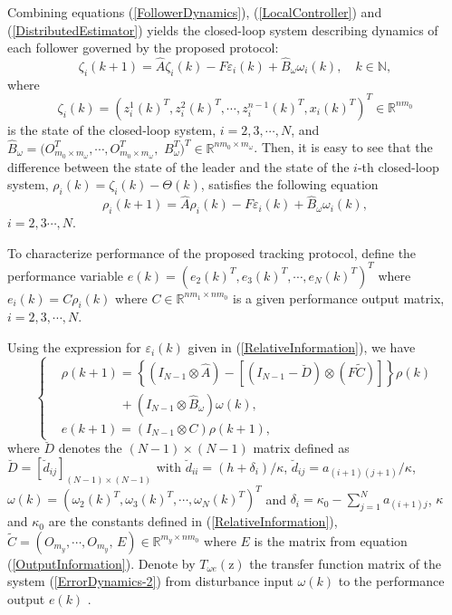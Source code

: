 \documentclass[a4paper,10pt,onecolumn]{article}
\begin{document}
Combining equations (\ref{FollowerDynamics}),
(\ref{LocalController}) and (\ref{DistributedEstimator}) yields the
closed-loop system describing dynamics of each follower governed by the
proposed protocol:
 \begin{equation}\label{ZetaEvolution}
 \zeta_{i}(k+1)=\hat{A}\zeta_{i}(k)-F\varepsilon_{i}(k)+\hat{B}_{\omega}{\omega}_{i}(k),\quad  k \in \mathbb{N},
 \end{equation}
where
\begin{equation}
\zeta_{i}(k)=\left(z_{i}^{1}(k)^{T},z_{i}^{2}(k)^{T},\cdots,z_{i}^{n-1}(k)^{T},x_{i}(k)^{T}\right)^{T}\in
\mathbb{R}^{nm_{0}}
\label{closed-loop-state}
\end{equation}
is the state of the closed-loop system,
$i=2,3,\cdots,N$, and
$\hat{B}_{\omega}=\big(O_{m_{0}\times m_{\omega}}^{T},\cdots,O_{m_{0}\times m_{\omega}}^{T},$ $B_{\omega}^{T}\big)^{T}\in \mathbb{R}^{nm_{0}\times m_{\omega}}$.
Then, it is easy to see that the difference between the state of the leader
and the state of the $i$-th closed-loop system,
$\rho_{i}(k)=\zeta_{i}(k)-\Theta(k)$, satisfies the following equation
 \begin{equation}\label{ErrorDynamics}
 \rho_{i}(k+1)=\hat{A}\rho_{i}(k)- F\varepsilon_{i}(k)+\hat{B}_{\omega}{\omega}_{i}(k),
 \end{equation}
$i=2,3\cdots,N$.

To characterize performance of the proposed tracking protocol,
define the performance variable
$e(k)=\left(e_{2}(k)^{T},e_{3}(k)^{T},\cdots,e_{N}(k)^{T}\right)^{T}$ where
$e_{i}(k)=C\rho_{i}(k)$ where  $C\in \mathbb{R}^{nm_{1}\times nm_{0}}$ is
a given performance output matrix, $i=2,3,\cdots,N$.

 Using the expression for $\varepsilon_i(k)$ given in
 (\ref{RelativeInformation}), we have
 \begin{equation} \label{ErrorDynamics-2}
\left\{\!\begin{aligned}
       &\rho(k+1){=}\left\{\!\left(I_{N-1}\otimes \hat{A}\right)-\left[\left(I_{N{-}1}{-}\breve{D}\right)\otimes (F\tilde{C})\right]\!\right\}\rho(k) \\
 &\quad \quad \quad \quad \;\;+
 (I_{N-1}\otimes \hat{B}_{\omega})\omega(k), \\
 &e(k+1)=\left(I_{N-1}\otimes C\right)\rho(k+1),
                          \end{aligned} \right.
                          \end{equation}
 where $\breve{D}$ denotes the $(N-1)\times (N-1)$ matrix defined as
 $\breve{D}=[\breve{d}_{ij}]_{(N-1)\times (N-1)}$ with
 $\breve{d}_{ii}={(h+\delta_{i})}/{\kappa}$,
 $\breve{d}_{ij}={a_{(i+1)(j+1)}}/{\kappa}$,
 $\omega(k)=({\omega}_{2}(k)^{T},{\omega}_{3}(k)^{T},\cdots,{\omega}_{N}(k)^{T})^{T}$ and
 $\delta_{i}=\kappa_{0}-\sum_{j=1}^{N}a_{(i+1)j}$, $\kappa$ and $\kappa_{0}$ are the constants defined in (\ref{RelativeInformation}), $\tilde{C}=(O_{m_{y}},\cdots,O_{m_{y}},\,E)\in
\mathbb{R}^{m_{y}\times nm_{0}}$ where $E$ is the matrix from equation
(\ref{OutputInformation}).
Denote by
$T_{\omega e}(\mathrm{z})$ the transfer function matrix of the system
(\ref{ErrorDynamics-2}) from disturbance input $\omega(k)$ to the
performance output $e(k)$ .
\end{document}
